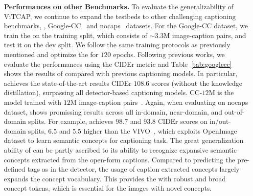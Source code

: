\noindent \textbf{Performances on other Benchmarks.}
\label{sec:otherdata} To evaluate the generalizability of ViTCAP, we continue to expand the testbeds to other challenging captioning benchmarks, \ie, Google-CC~\citep{sharma2018conceptual} and nocaps~\citep{agrawal2019nocaps} datasets. For the Google-CC dataset, we train the \vitcap on the training split, which consists of ${\sim}3.3$M image-caption pairs, and test it on the dev split. We follow the same training protocols as previously mentioned and optimize the \vitcap for $120$ epochs.  Following previous works, we evaluate the performances using the CIDEr metric and Table~\ref{tab:googlecc} shows the results of \vitcap compared with previous captioning models. In particular, \vitcap achieves the state-of-the-art results CIDEr $108.6$ scores (without the knowledge distillation), surpassing all detector-based captioning models. CC-$12$M is the model trained with $12$M image-caption pairs~\citep{changpinyo2021conceptual}. Again, when evaluating on nocaps dataset, \vitcap  shows promissing results across all in-domain, near-domain, and out-of-domain splits. For example, \vitcap achieves $98.7$ and $93.8$ CIDEr scores on in/out-domain splits, $6.5$ and $5.5$ higher than the VIVO~\citep{hu2020vivo}, which exploits OpenImage~\citep{kuznetsova2020open} dataset to learn semantic concepts for captioning task. 
The great generalization ability of \vitcap can be partly ascribed to its ability to recognize expansive semantic concepts extracted from the open-form captions. Compared to predicting the pre-defined tags as in the detector, the usage of caption extracted concepts largely expands the concept vocabulary. This provides the \vitcap with robust and broad concept tokens, which is essential for the images with novel concepts. 



